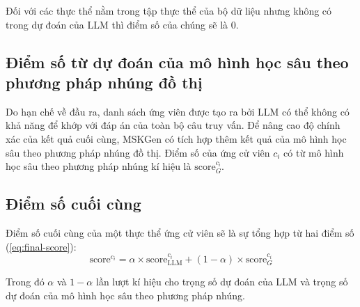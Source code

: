Đối với các thực thể nằm trong tập thực thể của bộ dữ liệu nhưng không có trong dự đoán của LLM thì điểm số của chúng sẽ là 0.

\vspace{1em}
\subsection{Điểm số từ dự đoán của mô hình học sâu theo phương pháp nhúng đồ thị}

Do hạn chế về đầu ra, danh sách ứng viên được tạo ra bởi LLM có thể không có khả năng để khớp với đáp án của toàn bộ câu truy vấn. Để nâng cao độ chính xác của kết quả cuối cùng, MSKGen có tích hợp thêm kết quả của mô hình học sâu theo phương pháp nhúng đồ thị. Điểm số của ứng cử viên $c_i$ có từ mô hình học sâu theo phương pháp nhúng kí hiệu là $\text{score}_G^{c_i}$.

\vspace{1em}
\subsection{Điểm số cuối cùng}

Điểm số cuối cùng của một thực thể ứng cử viên sẽ là sự tổng hợp từ hai điểm số (\ref{eq:final-score}):
\begin{equation}
    \label{eq:final-score}
    \text{score}^{c_i} = \alpha \times \text{score}^{c_i}_{\text{LLM}} + (1 - \alpha) \times \text{score}_G^{c_i}
\end{equation}

Trong đó $\alpha$ và $1 - \alpha$ lần lượt kí hiệu cho trọng số dự đoán của LLM và trọng số dự đoán của mô hình học sâu theo phương pháp nhúng.

